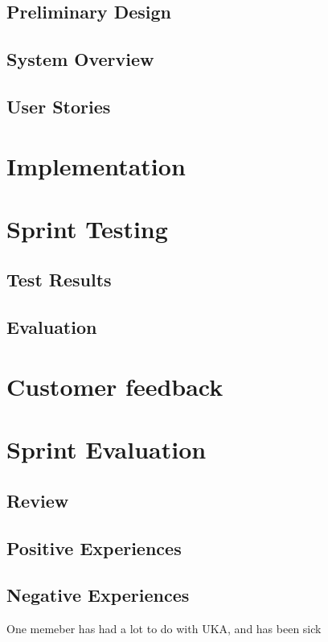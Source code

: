 \documentclass{report}
\begin{document}
\subsection{Preliminary Design} \label{subsec:prelim_design2}
\subsection{System Overview} \label{subsec:sys_overview2}
\subsection{User Stories} \label{subsec:user_stories2}
\section{Implementation} \label{sec:implementation2}
\section{Sprint Testing} \label{sec:sprint_testing2}
\subsection{Test Results} \label{subsec:test_results2}
\subsection{Evaluation} \label{subsec:evaluation2}
\section{Customer feedback} \label{sec:cust_feed2}
\section{Sprint Evaluation} \label{sec:sprint_eva2}
\subsection{Review} \label{subsec:review2}
\subsection{Positive Experiences} \label{subsec:pos_exp2}
\subsection{Negative Experiences} \label{subsec:neg_exp2}
One memeber has had a lot to do with UKA, and has been sick
\end{document}
